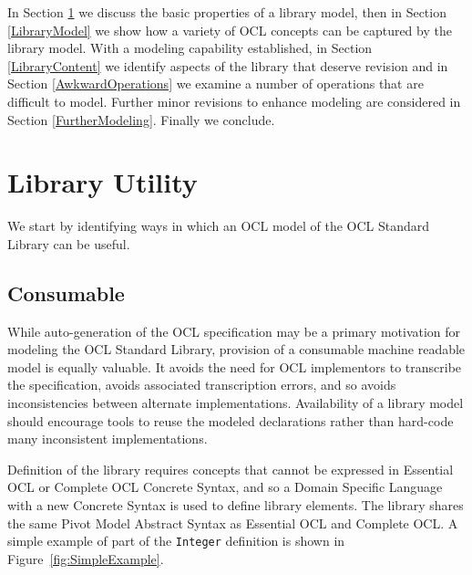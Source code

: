 \documentclass{eceasst}
\begin{document}
In Section \ref{LibraryUtility} we discuss the basic properties of a library model, then in Section \ref{LibraryModel} we show how a variety of OCL concepts can be captured by the library model. With a modeling capability established, in Section \ref{LibraryContent} we identify aspects of the library that deserve revision and in Section \ref{AwkwardOperations} we examine a number of operations that are difficult to model. Further minor revisions to enhance modeling are considered in Section \ref{FurtherModeling}. Finally we conclude. 

\section{Library Utility}\label{LibraryUtility}

We start by identifying ways in which an OCL model of the OCL Standard Library can be useful.
 
\subsection{Consumable}

While auto-generation of the OCL specification may be a primary motivation for modeling the OCL Standard Library, provision of a consumable machine readable model is equally valuable. It avoids the need for OCL implementors to transcribe the specification, avoids associated transcription errors, and so avoids inconsistencies between alternate implementations. Availability of a library model should encourage tools to reuse the modeled declarations rather than hard-code many inconsistent implementations.

Definition of the library requires concepts that cannot be expressed in Essential OCL or Complete OCL Concrete Syntax, and so a Domain Specific Language with a new Concrete Syntax is used to define library elements. The library shares the same Pivot Model Abstract Syntax as Essential OCL and Complete OCL. A simple example of part of the \verb|Integer| definition is shown in Figure~\ref{fig:SimpleExample}.
\end{document}
